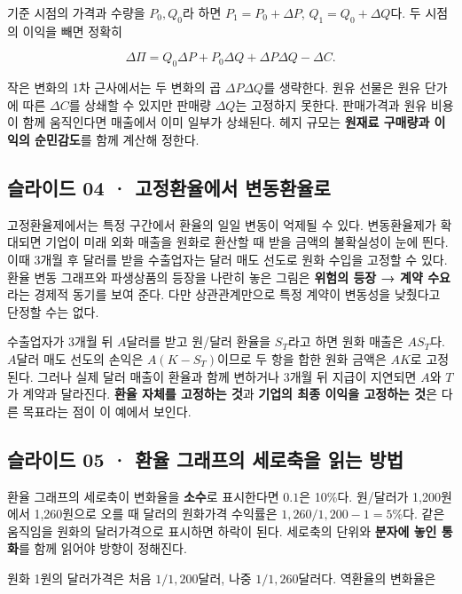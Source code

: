 \documentclass[11pt,a4paper]{article}
\begin{document}
기준 시점의 가격과 수량을 $P_0,Q_0$라 하면 $P_1=P_0+\Delta P$, $Q_1=Q_0+\Delta Q$다. 두 시점의 이익을 빼면 정확히\par

\[
\Delta\Pi=Q_0\Delta P+P_0\Delta Q+\Delta P\Delta Q-\Delta C.
\]

작은 변화의 1차 근사에서는 두 변화의 곱 $\Delta P\Delta Q$를 생략한다. 원유 선물은 원유 단가에 따른 $\Delta C$를 상쇄할 수 있지만 판매량 $\Delta Q$는 고정하지 못한다. 판매가격과 원유 비용이 함께 움직인다면 매출에서 이미 일부가 상쇄된다. 헤지 규모는 \textbf{원재료 구매량과 이익의 순민감도}를 함께 계산해 정한다.\par

\subsection{슬라이드 04 · 고정환율에서 변동환율로}
고정환율제에서는 특정 구간에서 환율의 일일 변동이 억제될 수 있다. 변동환율제가 확대되면 기업이 미래 외화 매출을 원화로 환산할 때 받을 금액의 불확실성이 눈에 띈다. 이때 3개월 후 달러를 받을 수출업자는 달러 매도 선도로 원화 수입을 고정할 수 있다. 환율 변동 그래프와 파생상품의 등장을 나란히 놓은 그림은 \textbf{위험의 등장 → 계약 수요}라는 경제적 동기를 보여 준다. 다만 상관관계만으로 특정 계약이 변동성을 낮췄다고 단정할 수는 없다.\par

수출업자가 3개월 뒤 $A$달러를 받고 원/달러 환율을 $S_T$라고 하면 원화 매출은 $AS_T$다. $A$달러 매도 선도의 손익은 $A(K-S_T)$이므로 두 항을 합한 원화 금액은 $AK$로 고정된다. 그러나 실제 달러 매출이 환율과 함께 변하거나 3개월 뒤 지급이 지연되면 $A$와 $T$가 계약과 달라진다. \textbf{환율 자체를 고정하는 것}과 \textbf{기업의 최종 이익을 고정하는 것}은 다른 목표라는 점이 이 예에서 보인다.\par

\subsection{슬라이드 05 · 환율 그래프의 세로축을 읽는 방법}
환율 그래프의 세로축이 변화율을 \textbf{소수}로 표시한다면 $0.1$은 10\%다. 원/달러가 1,200원에서 1,260원으로 오를 때 달러의 원화가격 수익률은 $1{,}260/1{,}200-1=5\%$다. 같은 움직임을 원화의 달러가격으로 표시하면 하락이 된다. 세로축의 단위와 \textbf{분자에 놓인 통화}를 함께 읽어야 방향이 정해진다.\par

원화 1원의 달러가격은 처음 $1/1{,}200$달러, 나중 $1/1{,}260$달러다. 역환율의 변화율은\par
\end{document}
